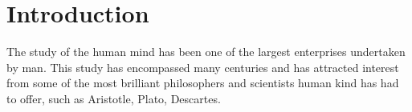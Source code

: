 \chapter{Introduction}
\label{chap-one}


The study of the human mind has been one of the largest
enterprises undertaken by man. This study has encompassed many
centuries and has attracted interest from some of the most brilliant
philosophers and scientists human kind has had to offer, such as
Aristotle, Plato, Descartes.




